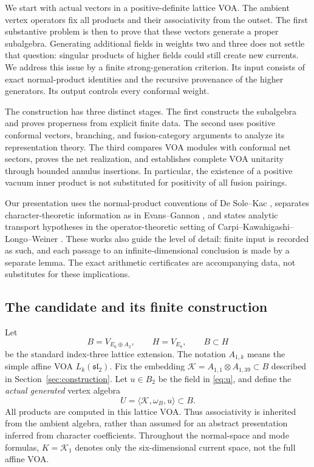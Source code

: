 \documentclass[11pt,a4paper]{article}
\theoremstyle{definition}
\begin{document}
We start with actual vectors in a positive-definite lattice VOA. The
ambient vertex operators fix all products and their associativity from
the outset. The first substantive problem is then to prove that these
vectors generate a proper subalgebra. Generating additional fields in
weights two and three does not settle that question: singular products
of higher fields could still create new currents. We address this issue
by a finite strong-generation criterion. Its input consists of exact
normal-product identities and the recursive provenance of the higher
generators. Its output controls every conformal weight.

The construction has three distinct stages. The first constructs the subalgebra and
proves properness from explicit finite data. The second uses positive
conformal vectors, branching, and fusion-category arguments to analyze
its representation theory. The third compares VOA modules with conformal
net sectors, proves the net realization, and establishes complete
VOA unitarity through bounded annulus insertions. In particular,
the existence of a positive vacuum inner product is not substituted for
positivity of all fusion pairings.

Our presentation uses the normal-product conventions of De Sole--Kac
\cite[Section 2]{DSK}, separates character-theoretic information as in
Evans--Gannon \cite{EG}, and states analytic transport hypotheses in the
operator-theoretic setting of Carpi--Kawahigashi--Longo--Weiner \cite{CKLW}.
These works also guide the level of detail: finite input is recorded as
such, and each passage to an infinite-dimensional conclusion is made by
a separate lemma. The exact arithmetic certificates are accompanying
data, not substitutes for these implications.

\subsection{The candidate and its finite construction}

Let
\[
 B=V_{E_6\oplus A_2},\qquad H=V_{E_8},\qquad B\subset H
\]
be the standard index-three lattice extension. The notation \(A_{1,k}\)
means the simple affine VOA \(L_k(\mathfrak{sl}_2)\). Fix the embedding
\(\mathcal K=A_{1,1}\otimes A_{1,39}\subset B\) described in
Section~\ref{sec:construction}. Let \(u\in B_2\) be the field in
\eqref{eq:u}, and define the \emph{actual generated} vertex algebra
\begin{equation}\label{eq:U}
 U=\langle\mathcal K,\omega_B,u\rangle\subset B.
\end{equation}
All products are computed in this lattice VOA. Thus associativity is
inherited from the ambient algebra, rather than assumed for an abstract
presentation inferred from character coefficients.
Throughout the normal-space and mode formulas, \(K=\mathcal K_1\)
denotes only the six-dimensional current space, not the full affine VOA.
\end{document}
